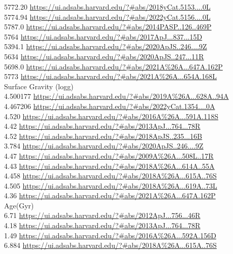 5772.20 \url{https://ui.adsabs.harvard.edu/?#abs/2018yCat.5153....0L}\\
5774.94 \url{https://ui.adsabs.harvard.edu/?#abs/2022yCat.5156....0L}\\
5787.0 \url{https://ui.adsabs.harvard.edu/?#abs/2014PASP..126..469P}\\
5764 \url{https://ui.adsabs.harvard.edu/?#abs/2017ApJ...837...15D}\\
5394.1 \url{https://ui.adsabs.harvard.edu/?#abs/2020ApJS..246....9Z}\\
5634 \url{https://ui.adsabs.harvard.edu/?#abs/2020ApJS..247...11R}\\
5698.0 \url{https://ui.adsabs.harvard.edu/?#abs/2021A%26A...647A.162P}\\
5773 \url{https://ui.adsabs.harvard.edu/?#abs/2021A%26A...654A.168L}\\
Surface Gravity (logg)\\
4.500177 \url{https://ui.adsabs.harvard.edu/?#abs/2019A%26A...628A..94A}\\
4.467206 \url{https://ui.adsabs.harvard.edu/?#abs/2022yCat.1354....0A}\\
4.520 \url{https://ui.adsabs.harvard.edu/?#abs/2016A%26A...591A.118S}\\
4.42 \url{https://ui.adsabs.harvard.edu/?#abs/2013ApJ...764...78R}\\
4.52 \url{https://ui.adsabs.harvard.edu/?#abs/2018ApJS..235...16B}\\
3.784 \url{https://ui.adsabs.harvard.edu/?#abs/2020ApJS..246....9Z}\\
4.47 \url{https://ui.adsabs.harvard.edu/?#abs/2009A%26A...508L..17R}\\
4.43 \url{https://ui.adsabs.harvard.edu/?#abs/2018A%26A...614A..55A}\\
4.458 \url{https://ui.adsabs.harvard.edu/?#abs/2018A%26A...615A..76S}\\
4.505 \url{https://ui.adsabs.harvard.edu/?#abs/2018A%26A...619A..73L}\\
4.36 \url{https://ui.adsabs.harvard.edu/?#abs/2021A%26A...647A.162P}\\
Age(Gyr)\\
6.71 \url{https://ui.adsabs.harvard.edu/?#abs/2012ApJ...756...46R}\\
4.18 \url{https://ui.adsabs.harvard.edu/?#abs/2013ApJ...764...78R}\\
1.49 \url{https://ui.adsabs.harvard.edu/?#abs/2016A%26A...592A.156D}\\
6.884 \url{https://ui.adsabs.harvard.edu/?#abs/2018A%26A...615A..76S}\\
